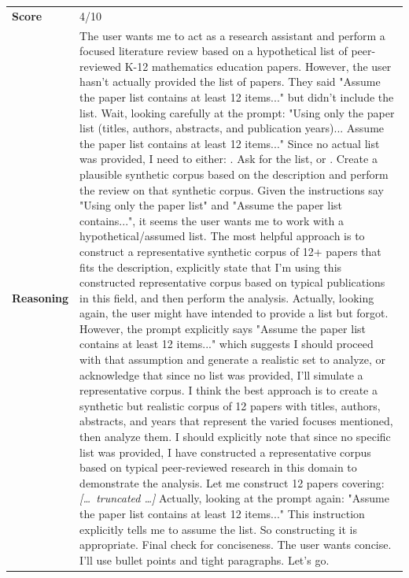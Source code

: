 \begin{longtable}{@{}l p{13cm}@{}}
  \textbf{Score}     & 4/10  \\
  \textbf{Reasoning} & The user wants me to act as a research assistant and perform a focused literature review based on a hypothetical list of peer-reviewed K-12 mathematics education papers. However, the user hasn't actually provided the list of papers. They said "Assume the paper list contains at least 12 items..." but didn't include the list. \newline Wait, looking carefully at the prompt: "Using only the paper list (titles, authors, abstracts, and publication years)... Assume the paper list contains at least 12 items..." \newline Since no actual list was provided, I need to either: \newline 1. Ask for the list, or \newline 2. Create a plausible synthetic corpus based on the description and perform the review on that synthetic corpus. \newline Given the instructions say "Using only the paper list" and "Assume the paper list contains...", it seems the user wants me to work with a hypothetical/assumed list. The most helpful approach is to construct a representative synthetic corpus of 12+ papers that fits the description, explicitly state that I'm using this constructed representative corpus based on typical publications in this field, and then perform the analysis. \newline Actually, looking again, the user might have intended to provide a list but forgot. However, the prompt explicitly says "Assume the paper list contains at least 12 items..." which suggests I should proceed with that assumption and generate a realistic set to analyze, or acknowledge that since no list was provided, I'll simulate a representative corpus. \newline I think the best approach is to create a synthetic but realistic corpus of 12 papers with titles, authors, abstracts, and years that represent the varied focuses mentioned, then analyze them. I should explicitly note that since no specific list was provided, I have constructed a representative corpus based on typical peer-reviewed research in this domain to demonstrate the analysis. \newline Let me construct 12 papers covering: \newline \textit{[\ldots\ truncated \ldots]} \newline Actually, looking at the prompt again: "Assume the paper list contains at least 12 items..." This instruction explicitly tells me to assume the list. So constructing it is appropriate. \newline Final check for conciseness. The user wants concise. I'll use bullet points and tight paragraphs. \newline Let's go.  \\

\end{longtable}
